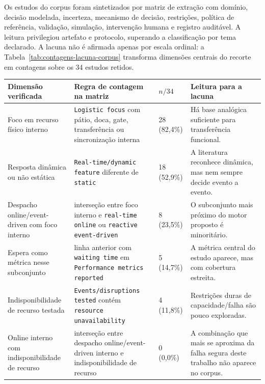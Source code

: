 \documentclass[
  12pt,
  oneside,
  a4paper,
  sumario=tradicional,
  brazil
]{abntex2}
\begin{document}
Os estudos do corpus foram sintetizados por matriz de extra\c{c}\~ao com dom\'inio, decis\~ao modelada, incerteza, mecanismo de decis\~ao, restri\c{c}\~oes, pol\'itica de refer\^encia, valida\c{c}\~ao, simula\c{c}\~ao, interven\c{c}\~ao humana e registro audit\'avel. A leitura privilegiou artefato e protocolo, superando a classifica\c{c}\~ao por tema declarado. A lacuna n\~ao \'e afirmada apenas por escala ordinal: a Tabela~\ref{tab:contagens-lacuna-corpus} transforma dimens\~oes centrais do recorte em contagens sobre os 34 estudos retidos.

\begin{table}[H]
\centering
\scriptsize
\setlength{\tabcolsep}{4pt}
\renewcommand{\arraystretch}{1.18}
\begin{tabularx}{\textwidth}{@{}P{0.24\textwidth}P{0.34\textwidth}C{0.12\textwidth}Y@{}}
\toprule
{}
\textbf{Dimens\~ao verificada} & \textbf{Regra de contagem na matriz} & \textbf{$n/34$} & \textbf{Leitura para a lacuna} \\
\midrule
Foco em recurso f\'isico interno & \texttt{Logistic focus} com p\'atio, doca, gate, transfer\^encia ou sincroniza\c{c}\~ao interna & 28 (82{,}4\%) & H\'a base anal\'ogica suficiente para transfer\^encia funcional. \\
\addlinespace
Resposta din\^amica ou n\~ao est\'atica & \texttt{Real-time/dynamic feature} diferente de \texttt{static} & 18 (52{,}9\%) & A literatura reconhece din\^amica, mas nem sempre decide evento a evento. \\
\addlinespace
Despacho online/event-driven com foco interno & interse\c{c}\~ao entre foco interno e \texttt{real-time online} ou \texttt{reactive event-driven} & 8 (23{,}5\%) & O subconjunto mais pr\'oximo do motor proposto \'e minorit\'ario. \\
\addlinespace
Espera como m\'etrica nesse subconjunto & linha anterior com \texttt{waiting time} em \texttt{Performance metrics reported} & 5 (14{,}7\%) & A m\'etrica central do estudo aparece, mas com cobertura estreita. \\
\addlinespace
Indisponibilidade de recurso testada & \texttt{Events/disruptions tested} cont\'em \texttt{resource unavailability} & 4 (11{,}8\%) & Restri\c{c}\~oes duras de capacidade/falha s\~ao pouco exploradas. \\
\addlinespace
Online interno com indisponibilidade de recurso & interse\c{c}\~ao entre despacho online/event-driven interno e indisponibilidade de recurso & 0 (0{,}0\%) & A combina\c{c}\~ao que mais se aproxima da falha segura deste trabalho n\~ao aparece no corpus. \\

\end{tabularx}
\end{table}
\end{document}
